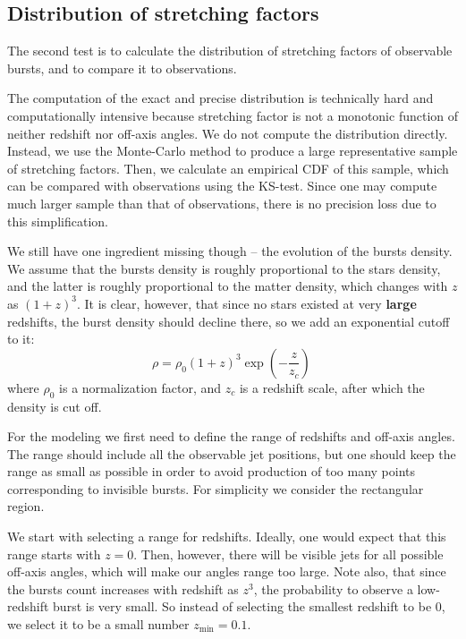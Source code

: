 \documentclass{article}
\begin{document}
\subsection{Distribution of stretching factors}
\label{sec:distribution}

The second test is to calculate the distribution of stretching factors
of observable bursts, and to compare it to observations.

The computation of the exact and precise distribution is technically
hard and computationally intensive because stretching factor is not a
monotonic function of neither redshift nor off-axis angles.  We do not
compute the distribution directly. Instead, we use the Monte-Carlo
method to produce a large representative sample of stretching
factors. Then, we calculate an empirical CDF of this sample, which can
be compared with observations using the KS-test. Since one may compute
much larger sample than that of observations, there is no precision
loss due to this simplification.

We still have one ingredient missing though -- the evolution of the
bursts density. We assume that the bursts density is roughly
proportional to the stars density, and the latter is roughly
proportional to the matter density, which changes with $z$ as
$\left(1+z\right)^3$. It is clear, however, that since no stars
existed at very {\bf large} redshifts, the burst density should decline
there, so we add an exponential cutoff to it:
\begin{equation}\label{eq:redshift}
\rho = \rho_0 \left(1+z\right)^3 \exp\left(-\frac{z}{z_c}\right)\,
\end{equation}
where $\rho_0$ is a normalization factor, and $z_c$ is a redshift
scale, after which the density is cut off.

For the modeling we first need to define the range of redshifts and
off-axis angles. The range should include all the observable jet
positions, but one should keep the range as small as possible in order
to avoid production of too many points corresponding to invisible
bursts. For simplicity we consider the rectangular region.

We start with selecting a range for redshifts. Ideally, one would
expect that this range starts with $z=0$. Then, however, there will be
visible jets for all possible off-axis angles, which will make our
angles range too large. Note also, that since the bursts count
increases with redshift as $z^3$, the probability to observe a
low-redshift burst is very small. So instead of selecting the smallest
redshift to be $0$, we select it to be a small number $z_\text{min} = 0.1$.
\end{document}
